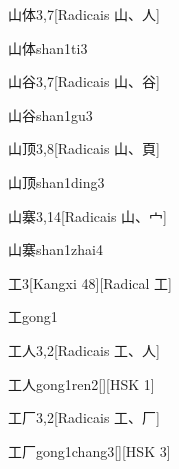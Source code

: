 \begin{entry}{山体}{3,7}[Radicais ⼭、⼈]
  \begin{phonetics}{山体}{shan1ti3}
  \end{phonetics}
\end{entry}

\begin{entry}{山谷}{3,7}[Radicais ⼭、⾕]
  \begin{phonetics}{山谷}{shan1gu3}
  \end{phonetics}
\end{entry}

\begin{entry}{山顶}{3,8}[Radicais ⼭、⾴]
  \begin{phonetics}{山顶}{shan1ding3}
  \end{phonetics}
\end{entry}

\begin{entry}{山寨}{3,14}[Radicais ⼭、⼧]
  \begin{phonetics}{山寨}{shan1zhai4}
  \end{phonetics}
\end{entry}

\begin{entry}{工}{3}[Kangxi 48][Radical ⼯]
  \begin{phonetics}{工}{gong1}
  \end{phonetics}
\end{entry}

\begin{entry}{工人}{3,2}[Radicais ⼯、⼈]
  \begin{phonetics}{工人}{gong1ren2}[][HSK 1]
  \end{phonetics}
\end{entry}

\begin{entry}{工厂}{3,2}[Radicais ⼯、⼚]
  \begin{phonetics}{工厂}{gong1chang3}[][HSK 3]
  \end{phonetics}
\end{entry}

